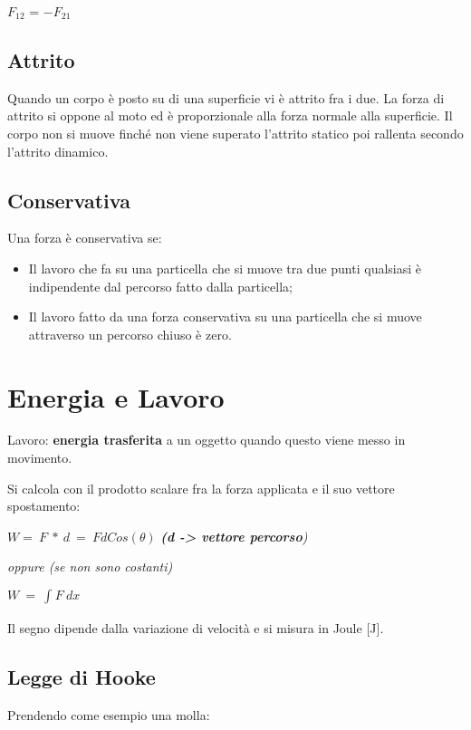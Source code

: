 \(F_{12}\) = \(- F_{21}\)

\subsection{Attrito}\label{attrito}

Quando un corpo è posto su di una superficie vi è attrito fra i due. La
forza di attrito si oppone al moto ed è proporzionale alla forza normale
alla superficie. Il corpo non si muove finché non viene superato
l'attrito statico poi rallenta secondo l'attrito dinamico.

\subsection{Conservativa}\label{conservativa}

Una forza è conservativa se:

\begin{itemize}
\item
  Il lavoro che fa su una particella che si muove tra due punti
  qualsiasi è indipendente dal percorso fatto dalla particella;
\item
  Il lavoro fatto da una forza conservativa su una particella che si
  muove attraverso un percorso chiuso è zero.
\end{itemize}

\section{Energia e Lavoro}\label{energia-e-lavoro}

Lavoro: \textbf{energia trasferita} a un oggetto quando questo viene
messo in movimento.

Si calcola con il prodotto scalare fra la forza applicata e il suo
vettore spostamento:

\(W = \ F\ *\ d\  = \ FdCos(\theta)\) \emph{\textbf{(d -\textgreater{}
vettore percorso})}

\emph{oppure (se non sono costanti)}

\(W\  = \ \int_{}^{}F\ dx\)

Il segno dipende dalla variazione di velocità e si misura in Joule
{[}J{]}.

\subsection{Legge di Hooke}\label{legge-di-hooke}

Prendendo come esempio una molla:

